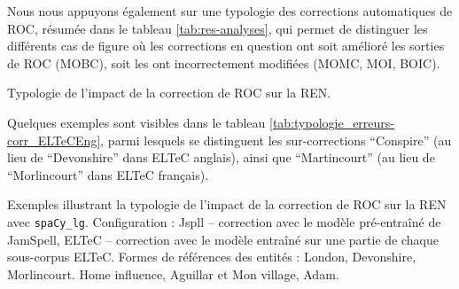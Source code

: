 Nous nous appuyons également sur une typologie des corrections automatiques de ROC, résumée dans le tableau \ref{tab:res-analyses}, qui permet de distinguer les différents cas de figure où les corrections en question ont soit amélioré les sorties de ROC (MOBC), soit les ont incorrectement modifiées (MOMC, MOI, BOIC). 

\begin{table}[h!]
\small
    \centering
    
    \caption{Typologie de l'impact de la correction de ROC sur la REN.  }
    \label{tab:res-analyses}
\end{table}

Quelques exemples sont visibles dans le tableau \ref{tab:typologie_erreurs-corr_ELTeCEng}, 
parmi lesquels se distinguent les sur-corrections ``Conspire'' 
(au lieu de ``Devonshire'' 
dans ELTeC anglais), ainsi que ``Martincourt'' (au lieu de ``Morlincourt'' dans ELTeC français).

\begin{table}[h!]
\small
    \centering
   
    \caption{Exemples illustrant la typologie de l'impact de la correction de ROC sur la REN avec \texttt{spaCy\_lg}. Configuration : Jspll -- correction avec le modèle pré-entraîné de JamSpell, ELTeC -- correction avec le modèle entraîné sur une partie de chaque sous-corpus ELTeC. Formes de références des entités : London, Devonshire, Morlincourt. {\normalfont Home influence}, Aguillar et {\normalfont Mon village}, Adam.}
    \label{tab:typologie_erreurs-corr_ELTeCEng}
\end{table}


%    

